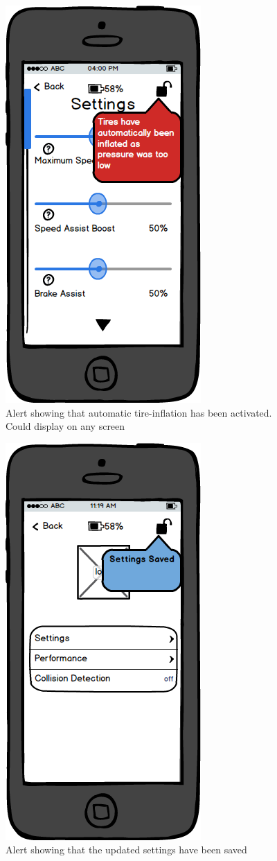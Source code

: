 \documentclass[a4paper]{report}
\begin{document}
\clearpage
\begin{figure}
\centering
\includegraphics[scale=0.9]{figures/prototype_1/inflation_settings}
\caption{Alert showing that automatic tire-inflation has been activated. Could display on any screen}
\end{figure}
\clearpage
\begin{figure}
\centering
\includegraphics[scale=0.9]{figures/prototype_1/settings_saved}
\caption{Alert showing that the updated settings have been saved}
\end{figure}
\clearpage
\end{document}
